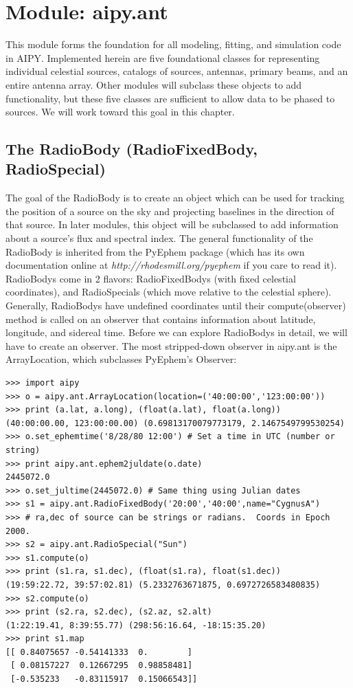 \section{Module: aipy.ant}

This module forms the foundation for all modeling, fitting, and simulation code
in AIPY.  Implemented herein are five foundational classes for representing
individual celestial sources, catalogs of sources, antennas, primary beams,
and an entire antenna array.  Other modules will subclass these objects
to add functionality, but these five classes are sufficient to allow
data to be phased to sources.  We will work toward this goal in this chapter.

\subsection{The RadioBody (RadioFixedBody, RadioSpecial)}

The goal of the RadioBody is to create an object which can be used for
tracking the position of a source on the sky and projecting baselines in
the direction of that source.  In later modules, this object will be
subclassed to add information about a source's flux and spectral index.
The general functionality of the RadioBody is inherited from the PyEphem
package (which has its own documentation online at 
{\it http://rhodesmill.org/pyephem} if you care to read it).  
RadioBodys come
in 2 flavors: RadioFixedBodys (with fixed celestial coordinates), and
RadioSpecials (which move relative to the celestial sphere).  Generally,
RadioBodys have undefined coordinates until their compute(observer)
method is called on an observer that contains information about latitude, 
longitude, and sidereal time.  Before we can explore RadioBodys
in detail, we will have to create an observer. The most stripped-down 
observer in aipy.ant is the ArrayLocation, which subclasses PyEphem's Observer:

\begin{verbatim}
>>> import aipy
>>> o = aipy.ant.ArrayLocation(location=('40:00:00','123:00:00'))
>>> print (a.lat, a.long), (float(a.lat), float(a.long))
(40:00:00.00, 123:00:00.00) (0.69813170079773179, 2.1467549799530254)
>>> o.set_ephemtime('8/28/80 12:00') # Set a time in UTC (number or string)
>>> print aipy.ant.ephem2juldate(o.date)
2445072.0
>>> o.set_jultime(2445072.0) # Same thing using Julian dates
>>> s1 = aipy.ant.RadioFixedBody('20:00','40:00',name="CygnusA")
>>> # ra,dec of source can be strings or radians.  Coords in Epoch 2000.
>>> s2 = aipy.ant.RadioSpecial("Sun")
>>> s1.compute(o)
>>> print (s1.ra, s1.dec), (float(s1.ra), float(s1.dec))
(19:59:22.72, 39:57:02.81) (5.2332763671875, 0.6972726583480835)
>>> s2.compute(o)
>>> print (s2.ra, s2.dec), (s2.az, s2.alt)
(1:22:19.41, 8:39:55.77) (298:56:16.64, -18:15:35.20)
>>> print s1.map
[[ 0.84075657 -0.54141333  0.        ]
 [ 0.08157227  0.12667295  0.98858481]
 [-0.535233   -0.83115917  0.15066543]]
\end{verbatim}

